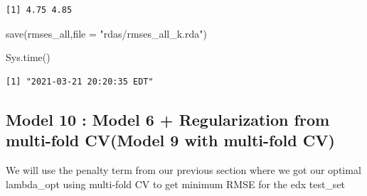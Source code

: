\documentclass[
]{article}
\newenvironment{Shaded}{}{}
\newcommand{\AttributeTok}[1]{\textcolor[rgb]{0.49,0.56,0.16}{#1}}
\newcommand{\FunctionTok}[1]{\textcolor[rgb]{0.02,0.16,0.49}{#1}}
\newcommand{\NormalTok}[1]{#1}
\newcommand{\StringTok}[1]{\textcolor[rgb]{0.25,0.44,0.63}{#1}}
\begin{document}
\begin{verbatim}
[1] 4.75 4.85
\end{verbatim}

\begin{Shaded}
\begin{Highlighting}[]
\FunctionTok{save}\NormalTok{(rmses\_all,}\AttributeTok{file =} \StringTok{"rdas/rmses\_all\_k.rda"}\NormalTok{)}

\FunctionTok{Sys.time}\NormalTok{()}
\end{Highlighting}
\end{Shaded}

\begin{verbatim}
[1] "2021-03-21 20:20:35 EDT"
\end{verbatim}

\newpage

\hypertarget{model-10-model-6-regularization-from-multi-fold-cvmodel-9-with-multi-fold-cv}{%
\subsection{Model 10 : Model 6 + Regularization from multi-fold CV(Model
9 with multi-fold
CV)}\label{model-10-model-6-regularization-from-multi-fold-cvmodel-9-with-multi-fold-cv}}

We will use the penalty term from our previous section where we got our
optimal lambda\_opt using multi-fold CV to get minimum RMSE for the edx
test\_set
\end{document}
